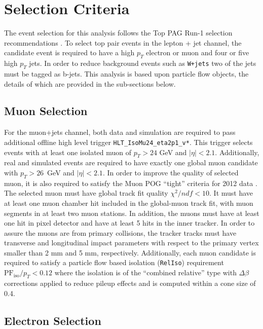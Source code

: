 \documentclass{cmspaperpdf}
\begin{document}
\clearpage
\section{Selection Criteria}
\label{sec:selection}

The event selection for this analysis follows the Top PAG Run-1 selection recommendations \cite{top_selection}.  To select top pair events in the lepton + jet channel, the candidate event is required to have a high $p_T$ electron or muon and four or five high $p_T$ jets.  In order to reduce background events such as \texttt{W+jets} two of the jets must be tagged as b-jets.   This analysis is based upon particle flow objects, the details of which are provided in the sub-sections below. 

\subsection{Muon Selection}

For the muon+jets channel, both data and simulation are required to pass additional offline high level trigger \texttt{HLT\_IsoMu24\_eta2p1\_v*}. This trigger selects events with at least one isolated muon of $p_T>24$ GeV and $|\eta|<2.1$.  Additionally, real and simulated events are required to have exactly one global muon candidate with $p_T>26$~GeV and $|\eta|<2.1$. In order to improve the quality of selected muon, it is also required to satisfy the Muon POG ``tight'' criteria for 2012 data \cite{Muon_POG}. The selected muon must have global track fit quality $\chi^2/ndf<10$. It must have at least one muon chamber hit included in the global-muon track fit, with muon segments in at least two muon stations. In addition, the muons must have at least one hit in pixel detector and have at least 5 hits in the inner tracker. In order to assure the muons are from primary collisions, the tracker tracks must have transverse and longitudinal impact parameters with respect to the primary vertex smaller than 2 mm and 5 mm, respectively.
Additionally, each muon candidate is required to satisfy a particle flow based isolation (\texttt{RelIso}) requirement $\mathrm{PF}_\mathrm{iso}/p_{T}<0.12$ where the isolation is of the ``combined relative'' type with $\Delta\beta$ corrections applied to reduce pileup effects and is computed within a cone size of 0.4. 

\subsection{Electron Selection}
\end{document}
